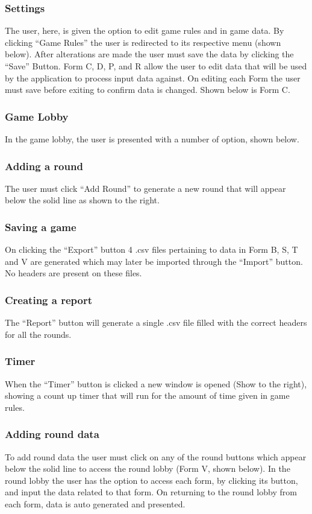 \documentclass{l3proj}
\begin{document}
\subsubsection{Settings}
The user, here, is given the option to edit game rules and in game data. 
By clicking “Game Rules” the user is redirected to its respective menu (shown below). After alterations are made the user must save the data by clicking the “Save” Button.
Form C, D, P, and R allow the user to edit data that will be used by the application to process input data against. On editing each Form the user must save before exiting to confirm data is changed. 
Shown below is Form C.
\subsubsection{Game Lobby}
In the game lobby, the user is presented with a number of option, shown below.
\subsubsection{Adding a round}
The user must click “Add Round” to generate a new round that will appear below the solid line as shown to the right.
\subsubsection{Saving a game}
On clicking the “Export” button 4 .csv files pertaining to data in Form B, S, T and V are generated which may later be imported through the “Import” button. No headers are present on these files.
\subsubsection{Creating a report}
The “Report” button will generate a single .csv file filled with the correct headers for all the rounds.
\subsubsection{Timer}
When the “Timer” button is clicked a new window is opened (Show to the right), showing a count up timer that will run for the amount of time given in game rules.
\subsubsection{Adding round data}
To add round data the user must click on any of the round buttons which appear below the solid line to access the round lobby (Form V, shown below).
In the round lobby the user has the option to access each form, by clicking its button, and input the data related to that form. On returning to the round lobby from each form, data is auto generated and presented.
\end{document}
